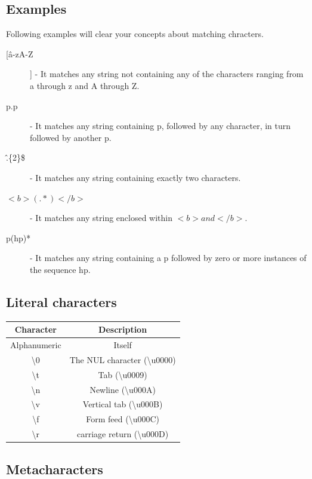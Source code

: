 \documentclass[11pt,a4paper]{article}
\begin{document}
\subsection*{Examples}

Following examples will clear your concepts about matching chracters.
\begin{description}
\item[[\^a-zA-Z]] -  It matches any string not containing any of the characters ranging from a through z and A through Z.
\item[p.p] -  It matches any string containing p, followed by any character, in turn followed by another p.
\item[\^.\{2\}\$] - It matches any string containing exactly two characters.
\item[$<b>(.*)</b>$] -  It matches any string enclosed within $<b> and </b>$.
\item[p(hp)*] - It matches any string containing a p followed by zero or more instances of the sequence hp.
\end{description}

\subsection*{Literal characters}

\begin{table}[ht]
\begin{center}
\begin{tabular}{| c | c |}\hline
\textbf{Character} & \textbf{Description}\\ \hline
Alphanumeric & Itself\\ \hline
\textbackslash 0 & The NUL character (\textbackslash u0000)\\ \hline
\textbackslash t & Tab (\textbackslash u0009)\\ \hline
\textbackslash n & Newline (\textbackslash u000A)\\ \hline
\textbackslash v &  Vertical tab (\textbackslash u000B)\\ \hline
\textbackslash f & Form feed (\textbackslash u000C)\\ \hline
\textbackslash r & carriage return (\textbackslash u000D)\\ \hline
\end{tabular}
\end{center}
\end{table}

\subsection*{Metacharacters}
\end{document}
